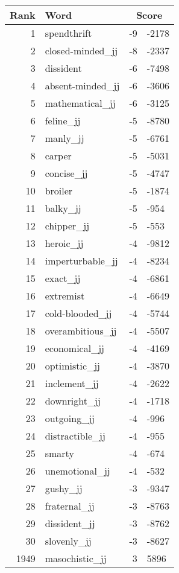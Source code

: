 \begin{longtable}[!htbp]{| rlr@{.}l |}
    \hline
    \textbf{Rank} & \textbf{Word} & \multicolumn{2}{c|}{\textbf{Score}} \\
    \hline
    \endhead
    1 & spendthrift & -9 & -2178 \\
    2 & closed-minded\_jj & -8 & -2337 \\
    3 & dissident & -6 & -7498 \\
    4 & absent-minded\_jj & -6 & -3606 \\
    5 & mathematical\_jj & -6 & -3125 \\
    6 & feline\_jj & -5 & -8780 \\
    7 & manly\_jj & -5 & -6761 \\
    8 & carper & -5 & -5031 \\
    9 & concise\_jj & -5 & -4747 \\
    10 & broiler & -5 & -1874 \\
    11 & balky\_jj & -5 & -954 \\
    12 & chipper\_jj & -5 & -553 \\
    13 & heroic\_jj & -4 & -9812 \\
    14 & imperturbable\_jj & -4 & -8234 \\
    15 & exact\_jj & -4 & -6861 \\
    16 & extremist & -4 & -6649 \\
    17 & cold-blooded\_jj & -4 & -5744 \\
    18 & overambitious\_jj & -4 & -5507 \\
    19 & economical\_jj & -4 & -4169 \\
    20 & optimistic\_jj & -4 & -3870 \\
    21 & inclement\_jj & -4 & -2622 \\
    22 & downright\_jj & -4 & -1718 \\
    23 & outgoing\_jj & -4 & -996 \\
    24 & distractible\_jj & -4 & -955 \\
    25 & smarty & -4 & -674 \\
    26 & unemotional\_jj & -4 & -532 \\
    27 & gushy\_jj & -3 & -9347 \\
    28 & fraternal\_jj & -3 & -8763 \\
    29 & dissident\_jj & -3 & -8762 \\
    30 & slovenly\_jj & -3 & -8627 \\
    1949 & masochistic\_jj & 3 & 5896 \\

\end{longtable}
